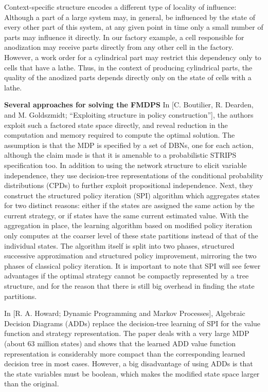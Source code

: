 \documentclass[11pt]{article}
\begin{document}
Context-specific structure encodes a different type of locality of influence: Although a part of a large system may, in general, be influenced by the state of every other part of this system, at any given point in time only a small number of parts may influence it directly.
In our factory example, a cell responsible for anodization may receive parts directly from any other cell in the factory. However, a work order for a cylindrical part may restrict this dependency only to cells that have a lathe. Thus, in the context of producing cylindrical parts, the quality of the anodized parts depends directly only on the state of cells with a lathe.


\textbf{Several approaches for solving the FMDPS}
%
In [C. Boutilier, R. Dearden, and M. Goldszmidt; “Exploiting structure in policy construction”], the authors exploit such a factored state space directly, and reveal reduction in the computation and memory required to compute the optimal solution. The assumption is that the MDP is specified by a set of DBNs, one for each action, although the claim made is that it is amenable to a probabilistic STRIPS specification too. In addition to using the network structure to elicit variable independence, they use decision-tree representations of the conditional probability distributions (CPDs) to further exploit propositional independence. Next, they construct the structured policy iteration (SPI) algorithm which aggregates states for two distinct reasons: either if the states are assigned the same action by the current strategy, or if states have the same current estimated value. With the aggregation in place, the learning algorithm based on modified policy iteration only computes at the coarser level of these state partitions instead of that of the individual states. The algorithm itself is split into two phases, structured successive approximation and structured policy improvement, mirroring the two phases of classical policy iteration. It is important to note that SPI will see fewer advantages if the optimal strategy cannot be compactly represented by a tree structure, and for the reason that there is still big overhead in finding the state partitions.

In [R. A. Howard; Dynamic Programming and Markov Processes], Algebraic Decision Diagrams (ADDs) replace the decision-tree learning of SPI for the value function and strategy representation. The paper deals with a very large MDP (about 63 million states) and shows that the learned ADD value function representation is considerably more compact than the corresponding learned decision tree in most cases. However, a big disadvantage of using ADDs is that the state variables must be boolean, which makes the modified state space larger than the original.
\end{document}
